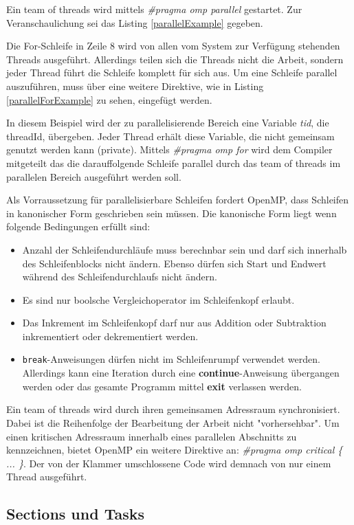 \documentclass[11pt]{scrartcl}
\begin{document}
Ein team of threads wird mittels \textit{\#pragma omp parallel} gestartet. Zur Veranschaulichung sei das Listing \ref{parallelExample} gegeben. 

Die For-Schleife in Zeile 8 wird von allen vom System zur Verfügung stehenden Threads ausgeführt. Allerdings teilen sich die Threads nicht die Arbeit, sondern jeder Thread führt die Schleife komplett für sich aus. Um eine Schleife parallel auszuführen, muss über eine weitere Direktive, wie in Listing \ref{parallelForExample} zu sehen, eingefügt werden. 

In diesem Beispiel wird der zu parallelisierende Bereich eine Variable \textit{tid}, die threadId, übergeben. Jeder Thread erhält diese Variable, die nicht gemeinsam genutzt werden kann (private). Mittels \textit{\#pragma omp for} wird dem Compiler mitgeteilt das die darauffolgende Schleife parallel durch das team of threads  im parallelen Bereich ausgeführt werden soll.

Als Vorraussetzung für parallelisierbare Schleifen fordert OpenMP, dass Schleifen in kanonischer Form geschrieben sein müssen. Die kanonische Form liegt wenn folgende Bedingungen erfüllt sind: 
\begin{itemize}
\item Anzahl der Schleifendurchläufe muss berechnbar sein und darf sich innerhalb des Schleifenblocks nicht ändern. Ebenso dürfen sich Start und Endwert während des Schleifendurchlaufs nicht ändern.
\item Es sind nur boolsche Vergleichoperator im Schleifenkopf erlaubt.
\item Das Inkrement im Schleifenkopf darf nur aus Addition oder Subtraktion inkrementiert oder dekrementiert werden. 
\item \texttt{break}-Anweisungen dürfen nicht im Schleifenrumpf verwendet werden. Allerdings kann eine Iteration durch eine \textbf{continue}-Anweisung übergangen werden oder das gesamte Programm mittel \textbf{exit} verlassen werden.
\end{itemize}

Ein team of threads wird durch ihren gemeinsamen Adressraum synchronisiert. Dabei ist die Reihenfolge der Bearbeitung der Arbeit nicht "vorhersehbar". Um einen kritischen Adressraum innerhalb eines parallelen Abschnitts zu kennzeichnen, bietet OpenMP ein weitere Direktive an: \textit{\#pragma omp critical \{ ... \}}. Der von der Klammer umschlossene Code wird demnach von nur einem Thread ausgeführt. 

\subsection{Sections und Tasks}
\end{document}
